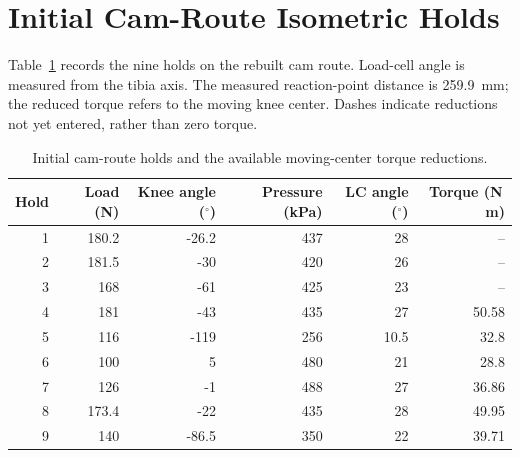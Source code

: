 \section{Initial Cam-Route Isometric Holds}

Table~\ref{tab:cam_holds} records the nine holds on the rebuilt cam route. Load-cell angle is measured from the tibia axis. The measured reaction-point distance is \qty{259.9}{\mm}; the reduced torque refers to the moving knee center. Dashes indicate reductions not yet entered, rather than zero torque.

\begin{table}[htbp]
\centering\small
\caption{Initial cam-route holds and the available moving-center torque reductions.}
\label{tab:cam_holds}
\begin{tabular}{@{}rrrrrr@{}}
\toprule
Hold & Load (N) & Knee angle ($^\circ$) & Pressure (kPa) & LC angle ($^\circ$) & Torque (N\,m)\\
\midrule
1 & 180.2 & -26.2 & 437 & 28 & --\\
2 & 181.5 & -30 & 420 & 26 & --\\
3 & 168 & -61 & 425 & 23 & --\\
4 & 181 & -43 & 435 & 27 & 50.58\\
5 & 116 & -119 & 256 & 10.5 & 32.8\\
6 & 100 & 5 & 480 & 21 & 28.8\\
7 & 126 & -1 & 488 & 27 & 36.86\\
8 & 173.4 & -22 & 435 & 28 & 49.95\\
9 & 140 & -86.5 & 350 & 22 & 39.71\\
\bottomrule
\end{tabular}
\end{table}
